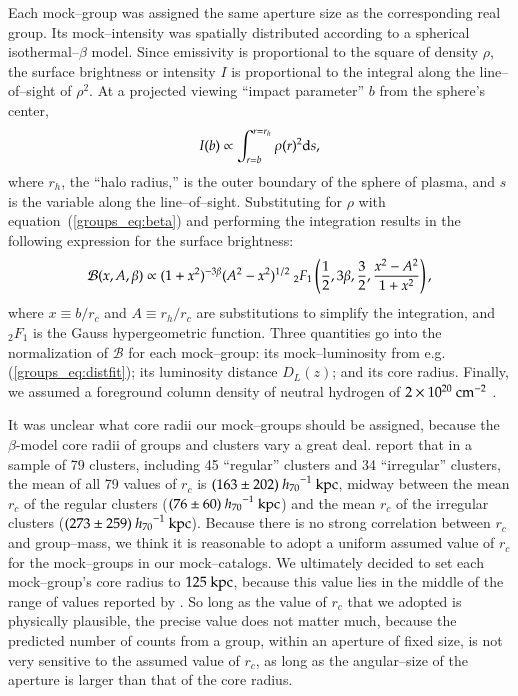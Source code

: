 Each mock--group was assigned the same aperture size as the
corresponding real group.  Its mock--intensity was spatially
distributed according to a spherical isothermal--$\beta$ model.  Since
emissivity is proportional to the square of density $\rho$, the
surface brightness or intensity $I$ is proportional to the integral
along the line--of--sight of $\rho^2$.  At a projected viewing
``impact parameter'' $b$ from the sphere's center,
\[
I(b) \propto \int_{r=b}^{r=r_h} \rho(r)^2 {\rm d} s,
\]
where $r_h$, the ``halo radius,'' is the outer boundary of the sphere
of plasma, and $s$ is the variable along the line--of--sight.
Substituting for $\rho$ with equation~(\ref{groups_eq:beta}) and
performing the integration results in the following expression for the
surface brightness:
\begin{equation}
\mathcal{B}(x,A,\beta) \propto (1+x^2)^{-3\beta} (A^2 - x^2)^{1/2} \mbox{ } { _2F_1}\left(\frac{1}{2},3\beta,\frac{3}{2},\frac{x^2-A^2}{1+x^2} \right),
\label{groups_eq:bright}
\end{equation}
where $x \equiv b/r_c$ and $A \equiv r_h/r_c$ are substitutions to
simplify the integration, and $_2F_1$ is the Gauss hypergeometric
function.  Three quantities go into the normalization of $\mathcal{B}$
for each mock--group: its mock--luminosity from
e.g. (\ref{groups_eq:distfit}); its luminosity distance $D_L(z)$; and
its core radius.  Finally, we assumed a foreground column density of
neutral hydrogen of $2\times10^{20}{\rm ~cm^{-2}}$
\citep{dicke+lockman1990}.

It was unclear what core radii our mock--groups should be assigned,
because the $\beta$-model core radii of groups and clusters vary a
great deal.  \citet*{ota+mitsuda2004} report that in a sample of 79
clusters, including 45 ``regular'' clusters and 34 ``irregular''
clusters, the mean of all 79 values of $r_c$ is $(163 \pm
202)~{h_{70}}^{-1}{\rm~kpc}$, midway between the mean $r_c$ of the
regular clusters ($(76 \pm 60)~{h_{70}}^{-1}{\rm~kpc}$) and the mean
$r_c$ of the irregular clusters ($(273 \pm
259)~{h_{70}}^{-1}{\rm~kpc}$).  Because there is no strong correlation
between $r_c$ and group--mass, we think it is reasonable to adopt a
uniform assumed value of $r_c$ for the mock--groups in our
mock--catalogs.  We ultimately decided to set each mock--group's core
radius to $125 {\rm~kpc}$, because this value lies in the middle of
the range of values reported by \citet*{ota+mitsuda2004}.  So long as
the value of $r_c$ that we adopted is physically plausible, the
precise value does not matter much, because the predicted number of
counts from a group, within an aperture of fixed size, is not very
sensitive to the assumed value of $r_c$, as long as the angular--size
of the aperture is larger than that of the core radius.

